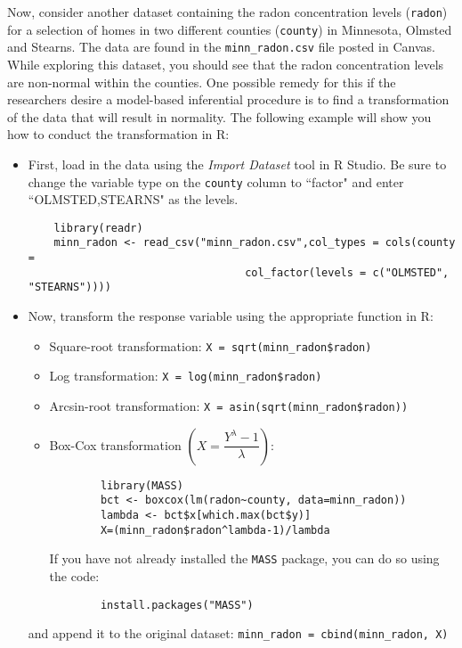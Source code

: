 \documentclass[11pt]{article}
\begin{document}
Now, consider another dataset containing the radon concentration levels (\texttt{radon}) for a selection of homes in two different counties (\texttt{county}) in Minnesota, Olmsted and Stearns. The data are found in the \texttt{minn\_radon.csv} file posted in Canvas. While exploring this dataset, you should see that the radon concentration levels are non-normal within the counties. One possible remedy for this if the researchers desire a model-based inferential procedure is to find a transformation of the data that will result in normality. The following example will show you how to conduct the transformation in R:
\begin{itemize}
	\item First, load in the data using the \textit{Import Dataset} tool in R Studio. Be sure to change the variable type on the \texttt{county} column to ``factor" and enter ``OLMSTED,STEARNS" as the levels.
	\begin{verbatim}
	library(readr)
	minn_radon <- read_csv("minn_radon.csv",col_types = cols(county = 
                                  col_factor(levels = c("OLMSTED", "STEARNS"))))
	\end{verbatim}
	\item Now, transform the response variable using the appropriate function in R:
	\begin{itemize}
		\item Square-root transformation: \texttt{X = sqrt(minn\_radon\$radon)}
		\item Log transformation: \texttt{X = log(minn\_radon\$radon)}
		\item Arcsin-root transformation: \texttt{X = asin(sqrt(minn\_radon\$radon))}
		\item Box-Cox transformation $\left(X = \dfrac{Y^{\lambda}-1}{\lambda} \right)$:
		\begin{verbatim}
		library(MASS)
		bct <- boxcox(lm(radon~county, data=minn_radon))
		lambda <- bct$x[which.max(bct$y)]
		X=(minn_radon$radon^lambda-1)/lambda
		\end{verbatim}
		If you have not already installed the \texttt{MASS} package, you can do so using the code:
		\begin{verbatim}
		install.packages("MASS")
		\end{verbatim}
	\end{itemize}
	and append it to the original dataset: \texttt{minn\_radon = cbind(minn\_radon, X)}
\end{itemize}
\end{document}

